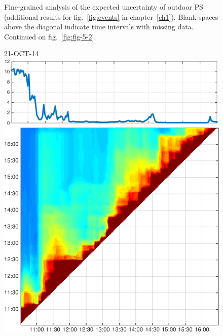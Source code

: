 \begin{figure}
\begin{minipage}[c]{\mylength}
\end{minipage}
\vspace{.5em}
\caption[Fine-grained analysis of the expected uncertainty of outdoor PS]{Fine-grained analysis of the expected uncertainty of outdoor PS (additional results for fig.~\ref{fig:events} in chapter~\ref{ch1}). Blank spaces above the diagonal indicate time intervals with missing data. Continued on fig.~\ref{fig:fig-5-2}.}
\label{fig:fig-5-1}
\end{figure}

\begin{figure}
\centering
\begin{minipage}[c]{\mylength}
\centering \scriptsize 21-OCT-14 \\
\includegraphics[valign=t,trim=0 0 5pt 0,angle=90,origin=tr,width=\sunintwidth,totalheight=\eventheight]{events/20141021-intensity.pdf}
\includegraphics[valign=t,width=\eventswidth]{events/20141021-maxGain-local-events.png}

\end{minipage}
\end{figure}
